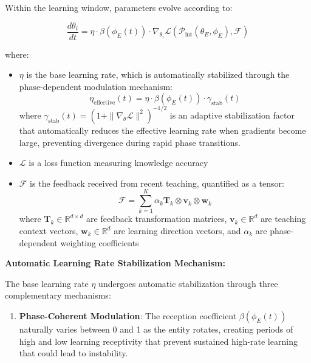 \begin{theorem}
Within the learning window, parameters evolve according to:

\begin{equation}
\frac{d\theta_i}{dt} = \eta \cdot \beta(\phi_E(t)) \cdot \nabla_{\theta_i} \mathcal{L}(\mathcal{P}_{\text{int}}(\theta_E, \phi_E), \mathcal{F})
\end{equation}

where:
\begin{itemize}
    \item $\eta$ is the base learning rate, which is automatically stabilized through the phase-dependent modulation mechanism:
    \begin{equation}
    \eta_{\text{effective}}(t) = \eta \cdot \beta(\phi_E(t)) \cdot \gamma_{\text{stab}}(t)
    \end{equation}
    where $\gamma_{\text{stab}}(t) = \left(1 + \|\nabla_{\theta} \mathcal{L}\|^2\right)^{-1/2}$ is an adaptive stabilization factor that automatically reduces the effective learning rate when gradients become large, preventing divergence during rapid phase transitions.
    
    \item $\mathcal{L}$ is a loss function measuring knowledge accuracy
    \item $\mathcal{F}$ is the feedback received from recent teaching, quantified as a tensor:
    \begin{equation}
    \mathcal{F} = \sum_{k=1}^K \alpha_k \mathbf{T}_k \otimes \mathbf{v}_k \otimes \mathbf{w}_k
    \end{equation}
    where $\mathbf{T}_k \in \mathbb{R}^{d \times d}$ are feedback transformation matrices, $\mathbf{v}_k \in \mathbb{R}^d$ are teaching context vectors, $\mathbf{w}_k \in \mathbb{R}^d$ are learning direction vectors, and $\alpha_k$ are phase-dependent weighting coefficients
\end{itemize}

\textbf{Automatic Learning Rate Stabilization Mechanism:}

The base learning rate $\eta$ undergoes automatic stabilization through three complementary mechanisms:

\begin{enumerate}
    \item \textbf{Phase-Coherent Modulation}: The reception coefficient $\beta(\phi_E(t))$ naturally varies between 0 and 1 as the entity rotates, creating periods of high and low learning receptivity that prevent sustained high-rate learning that could lead to instability.
    

\end{enumerate}
\end{theorem}
